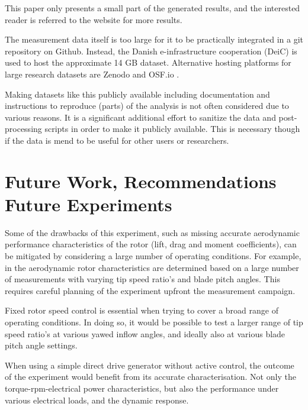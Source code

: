 \documentclass[a4paper]{jpconf}
\begin{document}
This paper only presents a small part of the generated results, and the interested reader is referred to the website for more results.

The measurement data itself is too large for it to be practically integrated in a git repository on Github. Instead, the Danish e-infrastructure cooperation (DeiC) \cite{deic:datamanagement} is used to host the approximate 14 GB dataset. Alternative hosting platforms for large research datasets are Zenodo \cite{zenodo} and OSF.io \cite{osf}. 

Making datasets like this publicly available including documentation and instructions to reproduce (parts) of the analysis is not often considered due to various reasons. It is a significant additional effort to sanitize the data and post-processing scripts in order to make it publicly available. This is necessary though if the data is mend to be useful for other users or researchers. %


\section{Future Work, Recommendations Future Experiments}

Some of the drawbacks of this experiment, such as missing accurate aerodynamic performance characteristics of the rotor (lift, drag and moment coefficients), can be mitigated by considering a large number of operating conditions. For example, in \cite{bottasso_calibration_2014} the aerodynamic rotor characteristics are determined based on a large number of measurements with varying tip speed ratio's and blade pitch angles. This requires careful planning of the experiment upfront the measurement campaign. 

Fixed rotor speed control is essential when trying to cover a broad range of operating conditions. In doing so, it would be possible to test a larger range of tip speed ratio's at various yawed inflow angles, and ideally also at various blade pitch angle settings.

When using a simple direct drive generator without active control, the outcome of the experiment would benefit from its accurate characterisation. Not only the torque-rpm-electrical power characteristics, but also the performance under various electrical loads, and the dynamic response.
\end{document}
